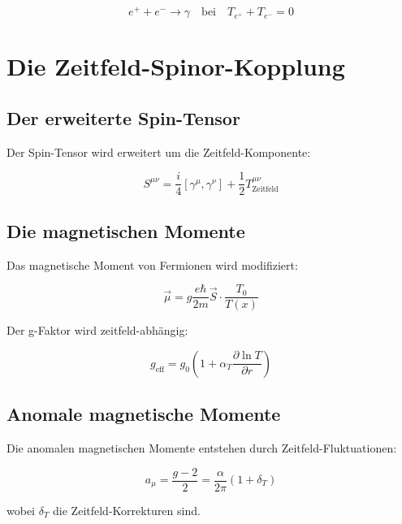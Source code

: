 \documentclass[12pt,a4paper]{report}
\begin{document}
	\begin{equation}
		e^+ + e^- \to \gamma \quad \text{bei} \quad T_{e^+} + T_{e^-} = 0
	\end{equation}
	
	\section{Die Zeitfeld-Spinor-Kopplung}
	
	\subsection{Der erweiterte Spin-Tensor}
	
	Der Spin-Tensor wird erweitert um die Zeitfeld-Komponente:
	
	\begin{equation}
		S^{\mu\nu} = \frac{i}{4}[\gamma^\mu, \gamma^\nu] + \frac{1}{2}T^{\mu\nu}_{\text{Zeitfeld}}
	\end{equation}
	
	\subsection{Die magnetischen Momente}
	
	Das magnetische Moment von Fermionen wird modifiziert:
	
	\begin{equation}
		\vec{\mu} = g\frac{e\hbar}{2m}\vec{S} \cdot \frac{T_0}{T(x)}
	\end{equation}
	
	Der g-Faktor wird zeitfeld-abhängig:
	
	\begin{equation}
		g_{\text{eff}} = g_0\left(1 + \alpha_T\frac{\partial\ln T}{\partial r}\right)
	\end{equation}
	
	\subsection{Anomale magnetische Momente}
	
	Die anomalen magnetischen Momente entstehen durch Zeitfeld-Fluktuationen:
	
	\begin{equation}
		a_\mu = \frac{g-2}{2} = \frac{\alpha}{2\pi}\left(1 + \delta_T\right)
	\end{equation}
	
	wobei $\delta_T$ die Zeitfeld-Korrekturen sind.
	
\end{document}
